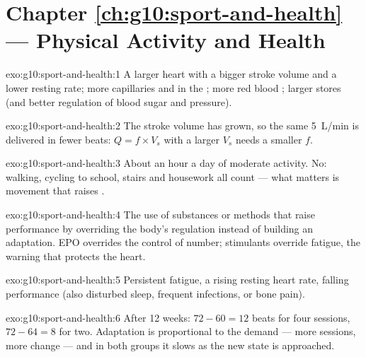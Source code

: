 \section*{Chapter \ref{ch:g10:sport-and-health} --- Physical Activity and Health}

\begin{solution}{exo:g10:sport-and-health:1}
A larger heart with a bigger stroke volume and a lower resting rate;
more capillaries and  in the ; more red blood
; larger  stores (and better regulation of blood sugar
and pressure).
\end{solution}

\begin{solution}{exo:g10:sport-and-health:2}
The stroke volume has grown, so the same \qty{5}{L/min} is delivered
in fewer beats: $Q = f \times V_s$ with a larger $V_s$ needs a smaller
$f$.
\end{solution}

\begin{solution}{exo:g10:sport-and-health:3}
About an hour a day of moderate activity. No: walking, cycling to
school, stairs and housework all count --- what matters is movement
that raises .
\end{solution}

\begin{solution}{exo:g10:sport-and-health:4}
The use of substances or methods that raise performance by overriding
the body's regulation instead of building an adaptation. EPO overrides
the control of  number; stimulants override fatigue, the
warning that protects the heart.
\end{solution}

\begin{solution}{exo:g10:sport-and-health:5}
Persistent fatigue, a rising resting heart rate, falling performance
(also disturbed sleep, frequent infections,  or bone pain).
\end{solution}

\begin{solution}{exo:g10:sport-and-health:6}
After 12 weeks: $72 - 60 = 12$ beats for four sessions, $72 - 64 = 8$
for two. Adaptation is proportional to the demand --- more sessions,
more change --- and in both groups it slows as the new state is
approached.
\end{solution}

